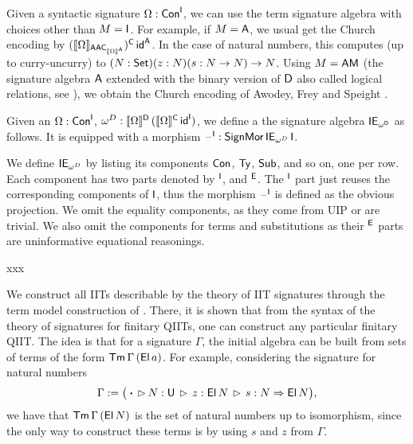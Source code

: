\documentclass[a4paper,UKenglish,cleveref, autoref]{lipics-v2019}
\begin{document}
\begin{remark}
  Given a syntactic signature $\Omega : \mathsf{Con}^{\mathsf{I}}$, we can use the term
  signature algebra with choices other than $M = \mathsf{I}$. For example, if
  $M = \mathsf{A}$, we usual get the Church encoding by
  $(\llbracket\Omega\rrbracket_{{\mathsf{A}\mathsf{A}\mathsf{C}}_{\llbracket\Omega\rrbracket^{\mathsf{A}}}})^{\mathsf{C}}\,\mathsf{id}^{\mathsf{A}}$. In the
  case of natural numbers, this computes (up to curry-uncurry) to
  $(N:\mathsf{Set})(z:N)(s:N\rightarrow N)\rightarrow N$. Using $M = {\mathsf{A}\mathsf{M}}$ (the signature
  algebra $\mathsf{A}$ extended with the binary version of $\mathsf{D}$ also called
  logical relations, see \cite[Section
  5]{Kaposi:2019:CQI:3302515.3290315}), we obtain the Church encoding
  of Awodey, Frey and Speight \cite{DBLP:conf/lics/AwodeyFS18}.
\end{remark}

\begin{definition}
  Given an $\Omega:\mathsf{Con}^{\mathsf{I}}$,
  $\omega^D : \llbracket\Omega\rrbracket^{\mathsf{D}}\,(\llbracket\Omega\rrbracket^{\mathsf{C}}\,\mathsf{id}^{\mathsf{I}})$, we define a
  the signature algebra $\mathsf{IE}_{\omega^{\mathsf{D}}}$ as follows. It is equipped
  with a morphism $\mathord{\hspace{1pt}\text{--}\hspace{1pt}}^{\mathsf{I}} : \mathsf{SignMor}\,\mathsf{IE}_{\omega^D}\,\mathsf{I}$.

  We define $\mathsf{IE}_{\omega^D}$ by listing its components $\mathsf{Con}$, $\mathsf{Ty}$,
  $\mathsf{Sub}$, and so on, one per row. Each component has two parts denoted
  by $^{\mathsf{I}}$, and $^{\mathsf{E}}$. The $^{\mathsf{I}}$ part just reuses the corresponding
  components of $\mathsf{I}$, thus the morphism $\mathord{\hspace{1pt}\text{--}\hspace{1pt}}^{\mathsf{I}}$ is defined as the
  obvious projection. We omit the equality components, as they come
  from UIP or are trivial. We also omit the components for terms and
  substitutions as their $^{\mathsf{E}}$ parts are uninformative equational
  reasonings.

xxx
\end{definition}



We construct all IITs describable by the theory of IIT signatures through the
term model construction of \cite{Kaposi:2019:CQI:3302515.3290315}. There, it is
shown that from the syntax of the theory of signatures for finitary QIITs, one
can construct any particular finitary QIIT. The idea is that for a signature
$\Gamma$, the initial algebra can be built from sets of terms of the form
$\mathsf{Tm}\,\Gamma\,(\mathsf{El}\,a)$. For example, considering the signature for natural
numbers
\[
  \Gamma := \big(\boldsymbol{\cdot}\,\rhd\,N:\mathsf{U}\,\rhd\,z : \mathsf{El}\,N\,\rhd\,s : N \Rightarrow \mathsf{El}\,N\big),
\]
we have that $\mathsf{Tm}\,\Gamma\,(\mathsf{El}\,N)$ is the set of natural numbers up to isomorphism,
since the only way to construct these terms is by using $s$ and $z$ from $\Gamma$.
\end{document}
